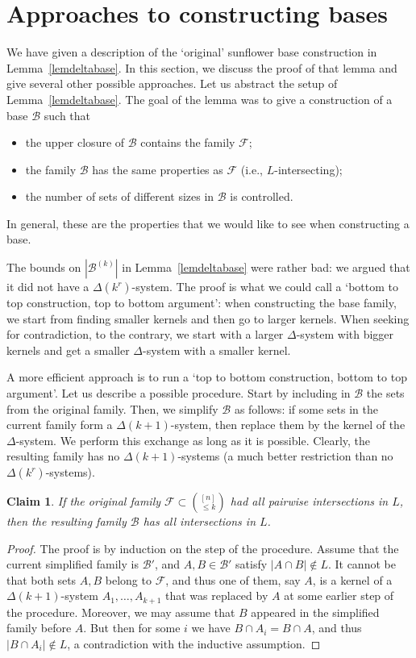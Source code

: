 \documentclass[graybox]{svmult}
\renewcommand{\le}{\leqslant}
\newcommand{\ff}{\mathcal{F}}
\newcommand{\bb}{\mathcal{B}}
\newcommand{\m}{\mathcal}
\newtheorem{cla}[thm]{Claim}
\begin{document}
 \section{Approaches to constructing bases}\label{secbase}
We have given a description of the `original' sunflower base construction in Lemma~\ref{lemdeltabase}. In this section, we discuss the proof of that lemma and give several other possible approaches. Let us abstract the setup of Lemma~\ref{lemdeltabase}.  The goal of the lemma was to give a construction of a base $\mathcal B$ such that
\begin{itemize} \item the upper closure of $\bb$ contains the family $\ff$;
\item the family $\bb$ has the same properties as $\ff$ (i.e., $L$-intersecting);
\item the number of sets of different sizes in $\mathcal B$ is controlled.
\end{itemize}
In general, these are the properties that we would like to see when constructing a base.

The bounds on $|\mathcal B^{(k)}|$ in Lemma~\ref{lemdeltabase} were rather bad: we argued that it did not have a $\Delta(k^r)$-system. The proof is what we could call a `bottom to top construction, top to bottom argument': when constructing the base family, we start from finding smaller kernels and then go to larger kernels. When seeking for contradiction, to the contrary, we start with a larger $\Delta$-system with bigger kernels and get a smaller $\Delta$-system with a smaller kernel.

A more efficient approach is to run a `top to bottom construction, bottom to top argument'. Let us describe a possible procedure. Start by including in $\m B$ the sets from the original family. Then, we simplify $\m B$ as follows: if some sets in the current family form a $\Delta(k+1)$-system, then replace them by the kernel of the $\Delta$-system. We perform this exchange as long as it is possible. Clearly, the resulting family has no $\Delta(k+1)$-systems (a much better restriction than no $\Delta(k^r)$-systems).
\begin{cla} If the original family $\ff\subset {[n]\choose \le k}$ had all pairwise intersections in $L$, then the resulting family $\mathcal B$ has all intersections  in $L$.
\end{cla}
\begin{proof}
  The proof is by induction on the step of the procedure. Assume that the current simplified family is $\bb'$, and $A,B\in \mathcal B'$ satisfy $|A\cap B|\notin L$. It cannot be that both sets $A,B$ belong to $\ff$, and thus one of them, say $A$, is a kernel of a $\Delta(k+1)$-system $A_1,\ldots, A_{k+1}$ that was replaced by $A$ at some earlier step of the procedure. Moreover, we may assume that $B$ appeared in the simplified family before $A$.  But then for some $i$ we have $B\cap A_i = B\cap A$, and thus $|B\cap A_i|\notin L$, a contradiction with the inductive assumption.
\end{proof}
\end{document}
